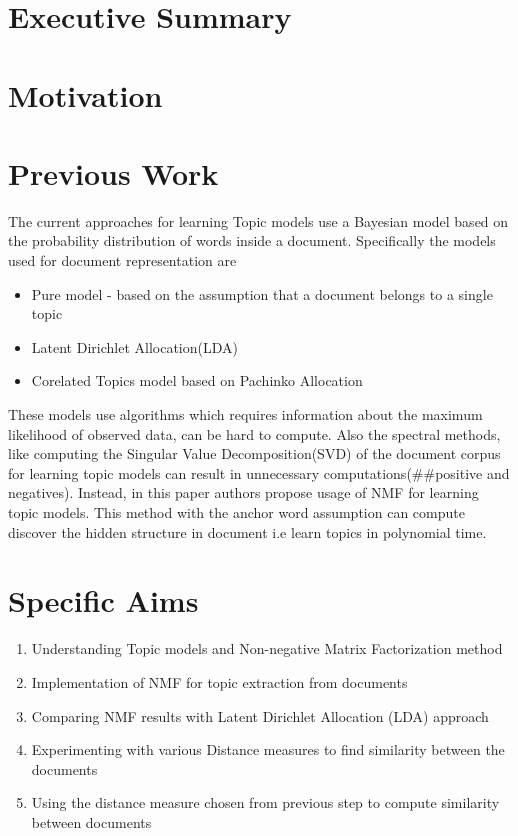 \documentclass[a4paper,11pt]{article}
\begin{document}
\section{Executive Summary}


\section{Motivation}


\section{Previous Work}

The current approaches for learning Topic models use a Bayesian model based on the probability distribution of words inside a document. Specifically the models used for document representation are

\begin{itemize} 
\item Pure model - based on the assumption that a document belongs to a single topic
\item Latent Dirichlet Allocation(LDA)
\item Corelated Topics model based on Pachinko Allocation
\end{itemize}

These models use algorithms which requires information about the maximum likelihood of observed data, can be hard to compute. Also the spectral methods, like computing the Singular Value Decomposition(SVD) of the document corpus for learning topic models can result in unnecessary computations(##positive and negatives). Instead, in this paper authors propose usage of NMF for learning topic models. This method with the anchor word assumption can compute discover the hidden structure in document i.e learn topics in polynomial time. 


\section{Specific Aims}

\begin{enumerate}
\item Understanding Topic models and Non-negative Matrix Factorization method
\item Implementation of NMF for topic extraction from documents
\item Comparing NMF results with Latent Dirichlet Allocation (LDA) approach
\item Experimenting with various Distance measures to find similarity between the documents
\item Using the distance measure chosen from previous step to compute similarity between documents
\end{enumerate}
\end{document}
